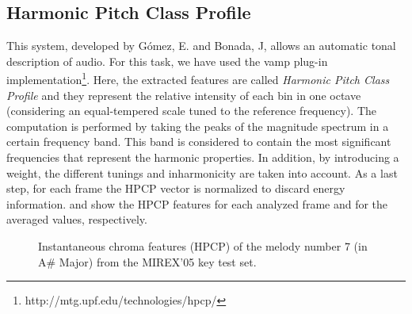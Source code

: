 \documentclass{article}
\begin{document}
\subsection{Harmonic Pitch Class Profile}\label{subsec:chroma_hpcp} %

This system, developed by G{\'o}mez, E. and Bonada, J, allows an automatic tonal description of audio. For this task, we have used the vamp plug-in implementation\footnote{http://mtg.upf.edu/technologies/hpcp/}. Here, the extracted features are called {\it Harmonic Pitch Class Profile} and they represent the relative intensity of each bin in one octave (considering an equal-tempered scale tuned to the reference frequency). The computation is performed by taking the peaks of the magnitude spectrum in a certain frequency band. This band is considered to contain the most significant frequencies that represent the harmonic properties. In addition, by introducing a weight, the different tunings and inharmonicity are taken into account. As a last step, for each frame the HPCP vector is normalized to discard energy information\cite{gomez05}.  and  show the HPCP features for each analyzed frame and for the averaged values, respectively.

\begin{figure}
 \centerline{}
 \caption{Instantaneous chroma features (HPCP) of the melody number 7 (in A\# Major) from the MIREX'05 key test set.}
 \label{fig:chroma07hpcp}
\end{figure}
\end{document}
